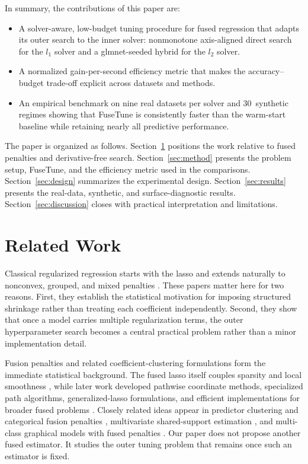 \documentclass[pdflatex,iicol,sn-mathphys-num]{sn-jnl}
\newcommand{\method}{\textsc{FuseTune}}
\def\textsc#1{#1}%
\def\texttt#1{#1}%
\def\method{FuseTune}%
\def\ell{l}%
\begin{document}
In summary, the contributions of this paper are:
\begin{itemize}
\item A solver-aware, low-budget tuning procedure for fused regression that adapts its outer search to the inner solver: nonmonotone axis-aligned direct search for the \(\ell_1\) solver and a \texttt{glmnet}-seeded hybrid for the \(\ell_2\) solver.
\item A normalized gain-per-second efficiency metric that makes the accuracy--budget trade-off explicit across datasets and methods.
\item An empirical benchmark on nine real datasets per solver and 30~synthetic regimes showing that \method{} is consistently faster than the warm-start baseline while retaining nearly all predictive performance.
\end{itemize}

The paper is organized as follows. Section~\ref{sec:related} positions the work relative to fused penalties and derivative-free search. Section~\ref{sec:method} presents the problem setup, \method{}, and the efficiency metric used in the comparisons. Section~\ref{sec:design} summarizes the experimental design. Section~\ref{sec:results} presents the real-data, synthetic, and surface-diagnostic results. Section~\ref{sec:discussion} closes with practical interpretation and limitations.

\section{Related Work}\label{sec:related}
Classical regularized regression starts with the lasso and extends naturally to nonconvex, grouped, and mixed penalties \cite{tibshirani1996lasso,fan2001scad,zou2005elastic,yuan2006group,zou2006adaptive,simon2013sparsegroup}. These papers matter here for two reasons. First, they establish the statistical motivation for imposing structured shrinkage rather than treating each coefficient independently. Second, they show that once a model carries multiple regularization terms, the outer hyperparameter search becomes a central practical problem rather than a minor implementation detail.

Fusion penalties and related coefficient-clustering formulations form the immediate statistical background. The fused lasso itself couples sparsity and local smoothness \cite{tibshirani2005fused}, while later work developed pathwise coordinate methods, specialized path algorithms, generalized-lasso formulations, and efficient implementations for broader fused problems \cite{friedman2007pathwise,hoefling2010path,tibshirani2011genlasso,arnold2015genlassodual,ye2010efficientfused}. Closely related ideas appear in predictor clustering and categorical fusion penalties \cite{bondell2008oscar,gertheiss2010categorical}, multivariate shared-support estimation \cite{obozinski2011supportunion}, and multi-class graphical models with fused penalties \cite{friedman2008glasso,danaher2014jgl}. Our paper does not propose another fused estimator. It studies the outer tuning problem that remains once such an estimator is fixed.
\end{document}
